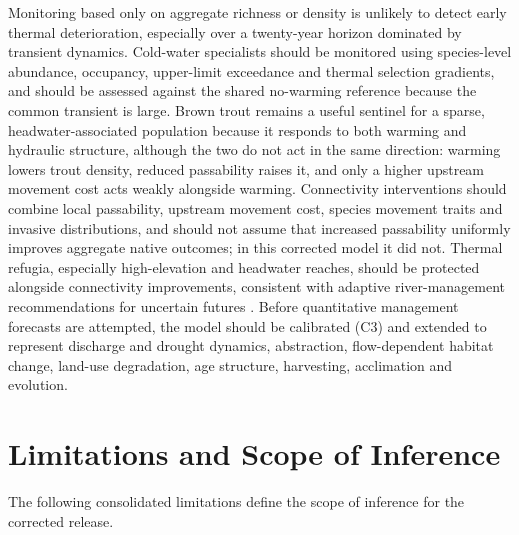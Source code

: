 \documentclass[11pt,a4paper]{article}
\begin{document}
Monitoring based only on aggregate richness or density is unlikely to detect early thermal deterioration, especially over a twenty-year horizon dominated by transient dynamics. Cold-water specialists should be monitored using species-level abundance, occupancy, upper-limit exceedance and thermal selection gradients, and should be assessed against the shared no-warming reference because the common transient is large. Brown trout remains a useful sentinel for a sparse, headwater-associated population because it responds to both warming and hydraulic structure, although the two do not act in the same direction: warming lowers trout density, reduced passability raises it, and only a higher upstream movement cost acts weakly alongside warming. Connectivity interventions should combine local passability, upstream movement cost, species movement traits and invasive distributions, and should not assume that increased passability uniformly improves aggregate native outcomes; in this corrected model it did not. Thermal refugia, especially high-elevation and headwater reaches, should be protected alongside connectivity improvements, consistent with adaptive river-management recommendations for uncertain futures \cite{tonkin2018preparing}. Before quantitative management forecasts are attempted, the model should be calibrated (C3) and extended to represent discharge and drought dynamics, abstraction, flow-dependent habitat change, land-use degradation, age structure, harvesting, acclimation and evolution.

\section{Limitations and Scope of Inference}

The following consolidated limitations define the scope of inference for the corrected release.
\end{document}
